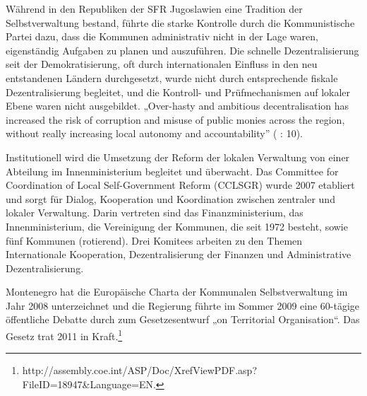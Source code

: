 Während in den Republiken der SFR Jugoslawien eine Tradition der Selbstverwaltung bestand, führte die starke Kontrolle durch die Kommunistische Partei dazu, dass die Kommunen administrativ nicht in der Lage waren, eigenständig Aufgaben zu planen und auszuführen. Die schnelle Dezentralisierung seit der Demokratisierung, oft durch internationalen Einfluss in den neu entstandenen Ländern durchgesetzt, wurde nicht durch entsprechende fiskale Dezentralisierung begleitet, und die Kontroll- und Prüfmechanismen auf lokaler Ebene waren nicht ausgebildet. „Over-hasty and ambitious decentralisation has increased the risk of corruption and misuse of public monies across the region, without really increasing local autonomy and accountability” (\cite{oecd04} : 10).\par
Institutionell wird die Umsetzung der Reform der lokalen Verwaltung von einer Abteilung im Innenministerium begleitet und überwacht. Das Committee for Coordination of Local Self-Government Reform (CCLSGR) wurde 2007 etabliert und sorgt für Dialog, Kooperation und Koordination zwischen zentraler und lokaler Verwaltung. Darin vertreten sind das Finanzministerium, das Innenministerium, die Vereinigung der Kommunen, die seit 1972 besteht, sowie fünf Kommunen (rotierend). Drei Komitees arbeiten zu den Themen Internationale Kooperation, Dezentralisierung der Finanzen und Administrative Dezentralisierung. \par
Montenegro hat die Europäische Charta der Kommunalen Selbstverwaltung im Jahr 2008 unterzeichnet und die Regierung führte im Sommer 2009 eine 60-tägige öffentliche Debatte durch zum Gesetzesentwurf „on Territorial Organisation“. Das Gesetz trat 2011 in Kraft.\footnote{http://assembly.coe.int/ASP/Doc/XrefViewPDF.asp?FileID=18947\&Language=EN.} 


